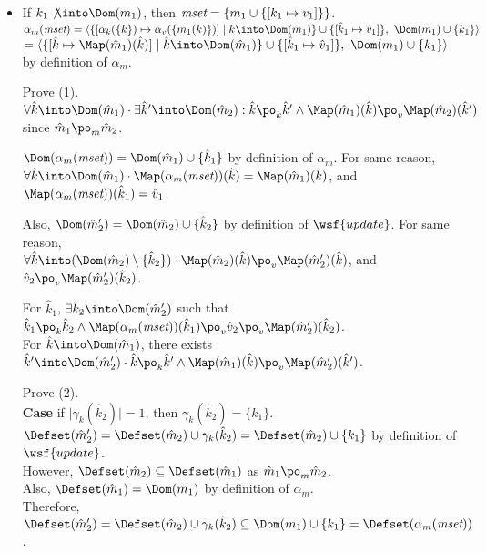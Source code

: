 \begin{itemize}
\item If $k_1 \not\into \Dom(m_1)$,
then $\emph{mset} = \{ m_1 \cup \{[k_1 \mapsto v_1]\} \}$.\\
$\alpha_m(\emph{mset}) = 
\langle \{ [\alpha_k(\{ k \}) \mapsto \alpha_v(\{ m_1(k) \} )] \mid k \into \Dom(m_1) \}
\cup \{ [ \hat{k}_1 \mapsto \hat{v}_1 ] \},\
\Dom(m_1) \cup \{ k_1 \} \rangle$\\
$= \langle \{ [ \hat{k} \mapsto \Map(\hat{m}_1)(\hat{k}) ] \mid \hat{k} \into \Dom(\hat{m}_1) \}
\cup \{ [ \hat{k}_1 \mapsto \hat{v}_1 ] \},\
\Dom(m_1) \cup \{ k_1 \} \rangle$
by definition of $\alpha_m$.

Prove (1). \\
$\forall \hat{k} \into \Dom(\hat{m}_1) \cdot \exists \hat{k}' \into \Dom(\hat{m}_2):
\hat{k} \po_k \hat{k}' \land \Map(\hat{m}_1)(\hat{k}) \po_v \Map(\hat{m}_2)(\hat{k}')$
since $\hat{m}_1 \po_m \hat{m}_2$.

$\Dom(\alpha_m(\emph{mset})) = \Dom(\hat{m}_1) \cup \{ \hat{k}_1 \} $ 
by definition of $\alpha_m$. For same reason, \\
$\forall \hat{k} \into \Dom(\hat{m}_1) \cdot
\Map(\alpha_m(\emph{mset}))(\hat{k}) = \Map(\hat{m}_1)(\hat{k})$,
and $\Map(\alpha_m(\emph{mset}))(\hat{k}_1) = \hat{v}_1$.

Also, $\Dom(\hat{m}_2') = \Dom(\hat{m}_2) \cup \{ \hat{k}_2 \}$
by definition of $\wsf{update}$. For same reason, \\
$\forall \hat{k} \into (\Dom(\hat{m}_2) \setminus \{ \hat{k}_2 \}) \cdot
\Map(\hat{m}_2)(\hat{k}) \po_v \Map(\hat{m}_2')(\hat{k})$,
and $\hat{v}_2 \po_v \Map(\hat{m}_2')(\hat{k}_2)$.

For $\hat{k}_1$, $\exists \hat{k}_2 \into \Dom(\hat{m}_2')$
such that $\hat{k}_1 \po_k \hat{k}_2 \land 
\Map(\alpha_m(\emph{mset}))(\hat{k}_1) \po_v \hat{v}_2 \po_v \Map(\hat{m}_2')(\hat{k}_2)$.\\
For $\hat{k} \into \Dom(\hat{m}_1)$,
there exists $\hat{k}' \into \Dom(\hat{m}_2') \cdot
\hat{k} \po_k \hat{k}' \land \Map(\hat{m}_1)(\hat{k}) \po_v \Map(\hat{m}_2')(\hat{k}')$.

Prove (2).\\
\textbf{Case} if $\mid \gamma_k(\hat{k}_2) \mid = 1$, then $\gamma_k(\hat{k}_2) = \{ k_1 \}$.\\
$\Defset(\hat{m}_2') = \Defset(\hat{m}_2) \cup \gamma_k(\hat{k}_2)
= \Defset(\hat{m}_2) \cup \{ k_1 \}$ by definition of $\wsf{update}$.\\
However, $\Defset(\hat{m}_2) \subseteq \Defset(\hat{m}_1)$ as $\hat{m}_1 \po_m \hat{m}_2$.\\
Also, $\Defset(\hat{m}_1) = \Dom(m_1)$ by definition of $\alpha_m$.\\
Therefore, $\Defset(\hat{m}_2') = 
\Defset(\hat{m}_2) \cup \gamma_k(\hat{k}_2) \subseteq \Dom(m_1) \cup \{ k_1 \}
= \Defset(\alpha_m(\emph{mset}))$.


\end{itemize}
